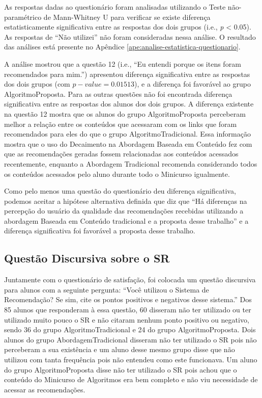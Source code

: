 As respostas dadas ao questionário foram analisadas utilizando o Teste não-paramétrico de
Mann-Whitney U para verificar se existe diferença estatisticamente significativa entre as respostas dos dois grupos (i.e., \textit{p} < 0.05).
As respostas de ``Não utilizei'' não foram consideradas nessa análise. O resultado das análises está presente no Apêndice
\ref{ape:analise-estatistica-questionario}.

A análise mostrou que a questão 12 (i.e., ``Eu entendi porque os itens foram recomendados para mim.'') apresentou
diferença significativa entre as respostas dos dois grupos (com $p-value = 0.01513$), e a diferença foi favorável ao grupo AlgoritmoProposta.
Para as outras questões não foi encontrada diferença significativa entre as respostas dos
alunos dos dois grupos. A diferença existente na questão 12 mostra que os alunos do grupo AlgoritmoProposta perceberam
melhor a relação entre os conteúdos que acessaram com os links que foram recomendados para eles
do que o grupo AlgoritmoTradicional. Essa informação mostra que o uso do Decaimento na Abordagem
Baseada em Conteúdo fez com que as recomendações geradas fossem relacionadas aos conteúdos acessados recentemente,
enquanto a Abordagem Tradicional recomenda considerando todos os conteúdos acessados pelo aluno durante todo o Minicurso
igualmente.

Como pelo menos uma questão do questionário deu diferença significativa, podemos aceitar a hipótese alternativa definida
que diz que ``Há diferenças na percepção do usuário da qualidade das recomendações recebidas utilizando a abordagem
Baseada em Conteúdo tradicional e a proposta desse trabalho'' e a diferença significativa foi favorável a proposta desse trabalho.

\subsection{Questão Discursiva sobre o SR}\label{subsection:questao-aberta}

Juntamente com o questionário de satisfação, foi colocada um questão discursiva para alunos com a seguinte pergunta:
``Você utilizou o Sistema de Recomendação? Se sim, cite os pontos positivos e negativos desse sistema.'' Dos 85 alunos
que responderam à essa questão, 60 disseram não ter utilizado ou ter utilizado muito pouco o SR
e não citaram nenhum ponto positivo ou negativo, sendo 36 do grupo AlgoritmoTradicional
e 24 do grupo AlgoritmoProposta. Dois alunos do grupo AbordagemTradicional disseram
não ter utilizado o SR pois não perceberam a sua existência e um aluno desse mesmo grupo disse que não utilizou com tanta frequência
pois não entendeu como este funcionava. Um aluno do grupo AlgoritmoProposta disse não ter utilizado
o SR pois achou que o conteúdo do Minicurso de Algoritmos era bem completo e não viu necessidade de acessar as recomendações.

